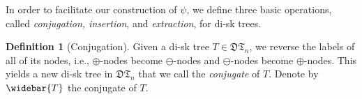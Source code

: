 \documentclass[12pt]{amsart}
\numberwithin{equation}{section}
\theoremstyle{plain}
\theoremstyle{definition}
\newtheorem{Def}[theorem]{Definition}
\newcommand{\DT}{\mathfrak{DT}}
\begin{document}
In order to facilitate our construction of $\psi$, we define three basic operations, called {\em conjugation, insertion}, and {\em extraction}, for di-sk trees. 

\begin{Def}[Conjugation]
Given a di-sk tree $T\in\DT_n$, we reverse the labels of all of its nodes, i.e., $\oplus$-nodes become $\ominus$-nodes and $\ominus$-nodes become $\oplus$-nodes. This yields a new di-sk tree in $\DT_n$ that we call the {\em conjugate} of $T$. Denote by    $\widebar{T}$ the conjugate of $T$.
\end{Def}
 


\end{document}
